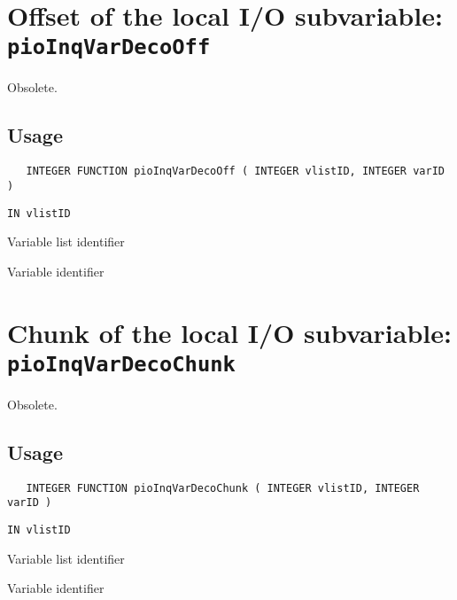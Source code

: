 \section{Offset of the local I/O subvariable: {\tt pioInqVarDecoOff}}
\label{pioInqVarDecoOff}
Obsolete. 

\subsection*{Usage}
\begin{verbatim}
   INTEGER FUNCTION pioInqVarDecoOff ( INTEGER vlistID, INTEGER varID )
\end{verbatim}

\hspace*{4mm}\begin{minipage}[]{15cm}
\begin{deflist}{\tt IN  vlistID\ } 
\item[{\tt IN  vlistID}]
Variable list identifier
\item[{\tt IN  varID}]
Variable identifier
\end{deflist}
\end{minipage}

\section{Chunk of the local I/O subvariable: {\tt pioInqVarDecoChunk}}
\label{pioInqVarDecoChunk}
Obsolete.

\subsection*{Usage}
\begin{verbatim}
   INTEGER FUNCTION pioInqVarDecoChunk ( INTEGER vlistID, INTEGER varID )
\end{verbatim}

\hspace*{4mm}\begin{minipage}[]{15cm}
\begin{deflist}{\tt IN  vlistID\ } 
\item[{\tt IN  vlistID}]
Variable list identifier
\item[{\tt IN  varID}]
Variable identifier
\end{deflist}
\end{minipage}